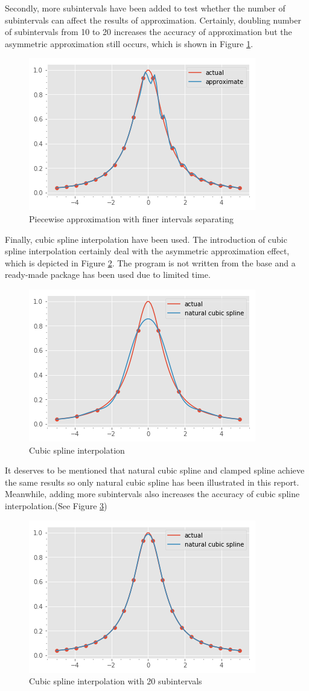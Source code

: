 \documentclass[preprint,12pt]{elsarticle}
\begin{document}
Secondly, more subintervals have been added to test whether the number of subintervals can affect the results of approximation. Certainly, doubling number of subintervals from 10 to 20 increases the accuracy of approximation but the asymmetric approximation still occurs, which is shown in Figure \ref{fig:further1}.

\begin{figure}[h]
\centering\includegraphics[width=0.4\linewidth]{runge_function_20.png}
\caption{Piecewise approximation with finer intervals separating}
\label{fig:further1}
\end{figure}

Finally, cubic spline interpolation have been used. The introduction of cubic spline interpolation certainly deal with the asymmetric approximation effect, which is depicted in Figure \ref{fig:further2}. The program is not written from the base and a ready-made package has been used due to limited time.

\begin{figure}[h]
\centering\includegraphics[width=0.4\linewidth]{cubic_spline.png}
\caption{Cubic spline interpolation}
\label{fig:further2}
\end{figure}

It deserves to be mentioned that natural cubic spline and clamped spline achieve the same results so only natural cubic spline has been illustrated in this report. Meanwhile, adding more subintervals also increases the accuracy of cubic spline interpolation.(See Figure \ref{fig:further3})

\begin{figure}[h]
\centering\includegraphics[width=0.4\linewidth]{cubic_spline_20.png}
\caption{Cubic spline interpolation with 20 subintervals}
\label{fig:further3}
\end{figure}
\end{document}
